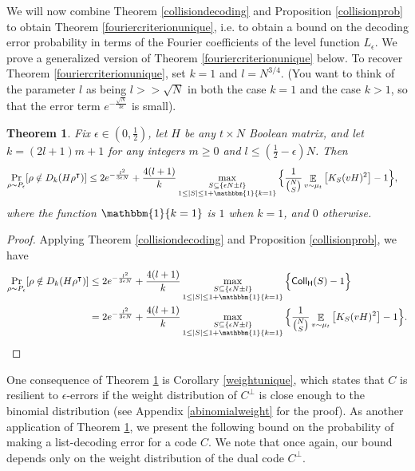 \documentclass[12pt]{article}
\newtheorem{theorem}{Theorem}
\newcommand{\E}{\mathop \mathbb{E}}
\begin{document}
We will now combine Theorem \ref{collisiondecoding} and Proposition \ref{collisionprob} to obtain Theorem \ref{fouriercriterionunique}, i.e. to obtain a bound on the decoding error probability in terms of the Fourier coefficients of the level function $L_\epsilon$. We prove a generalized version of Theorem \ref{fouriercriterionunique} below. To recover Theorem \ref{fouriercriterionunique}, set $k=1$ and $l=N^{3/4}$.
(You want to think of the parameter $l$ as being $l>>\sqrt{N}$ in both the case $k=1$ and the case $k>1$, so that the error term $e^{-\frac{\sqrt{N}}{3\epsilon}}$ is small). 
\begin{theorem}\label{fouriercriteriongeneral}
Fix $\epsilon \in(0,\frac{1}{2})$, let $H$ be any $t\times N$ Boolean matrix, and let $k=(2l+1)m +1$ for any integers $m \geq0$ and $l\leq (\frac{1}{2}-\epsilon)N$. Then
\begin{align*}
    \Pr_{\rho\sim P_\epsilon}[\rho\notin D_k(H\rho^\intercal)]&\leq 2e^{-\frac{l^2}{3\epsilon N}}+\frac{4(l+1)}{k}  \mathop{\max}_{\substack{S\subseteq \{\epsilon N\pm l\} \\
    1\leq|S|\leq 1+\mathbbm{1}\{k=1\}}} \Big\{  \frac{1}{\binom{N}{S}}\E_{v\sim\mu_t}\big[ K_S(vH)^2\big]-1 \Big\},
\end{align*}
where the function $\mathbbm{1}\{k=1\}$ is $1$ when $k=1$, and $0$ otherwise.
\end{theorem}
\begin{proof}
Applying Theorem \ref{collisiondecoding} and Proposition \ref{collisionprob}, we have
\begin{align*}
     \Pr_{\rho\sim P_\epsilon}[\rho\notin D_k(H\rho^\intercal)]&\leq 2e^{-\frac{l^2}{3\epsilon N}} +\frac{4(l+1)}{k} \mathop{\max}_{\substack{S\subseteq \{\epsilon N\pm l\} \\
    1\leq|S|\leq 1+\mathbbm{1}\{k=1\}}} \Big\{ \mathsf{Coll_H}(S)-1 \Big\}\\
    &=2e^{-\frac{l^2}{3\epsilon N}}+\frac{4(l+1)}{k}  \mathop{\max}_{\substack{S\subseteq \{\epsilon N\pm l\} \\
    1\leq|S|\leq 1+\mathbbm{1}\{k=1\}}} \Big\{  \frac{1}{\binom{N}{S}}\E_{v\sim\mu_t}\big[ K_S(vH)^2\big]-1 \Big\}.
\end{align*}
\end{proof}
One consequence of Theorem \ref{fouriercriteriongeneral} is Corollary \ref{weightunique}, which states that $C$ is resilient to $\epsilon$-errors if the weight distribution of $C^\perp$ is close enough to the binomial distribution (see Appendix \ref{abinomialweight} for the proof).
As another application of Theorem \ref{fouriercriteriongeneral}, we present the following bound on the probability of making a list-decoding error for a code $C$. We note that once again, our bound depends only on the weight distribution of the dual code $C^\perp$.
\end{document}
